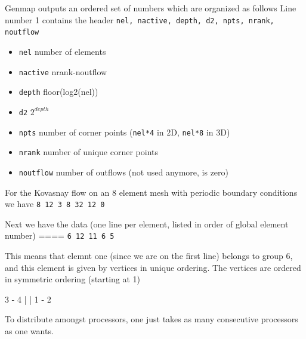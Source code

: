 Genmap outputs an ordered set of numbers which are organized as follows
Line number 1 contains the header {\tt nel, nactive, depth, d2, npts, nrank, noutflow}

\begin{itemize}
\item {\tt nel}  number of elements
\item {\tt nactive} nrank-noutflow
\item {\tt depth} floor(log2(nel))
\item {\tt d2} \(2^{depth}\)
\item {\tt npts} number of corner points ({\tt nel*4} in 2D, {\tt nel*8} in 3D)
\item {\tt nrank} number of unique corner points
\item {\tt noutflow} number of outflows (not used anymore, is zero)
\end{itemize}

For the Kovasnay flow on an 8 element mesh with periodic boundary conditions we have
 {\tt 8         12          3          8         32         12          0}
 

Next we have the data (one line per element, listed in order of global element number)
====
{\tt 6          12          11           6           5}

This means that elemnt one (since we are on the first line) belongs to group 6, and this element is given by vertices in unique ordering. 
The vertices are ordered in symmetric ordering (starting at 1)

3 - 4
|   |
1 - 2

To distribute amongst processors, one just takes as many consecutive
processors as one wants.
